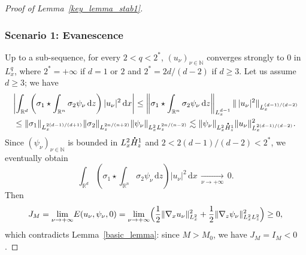 \documentclass[10pt]{amsart}
\theoremstyle{definition}
\newcommand*{\overbigdot}[1]{%
\accentset{\mbox{\large\bfseries .}}{#1}}
\newenvironment{ProofOf}[1]{\begin{proof}[Proof of #1]}{\end{proof}}
\newcommand{\R}{\mathbb{R}}
\newcommand{\ud}{\, {\mathrm{d}}}
\begin{document}
\begin{ProofOf}{Lemma~\ref{key_lemma_stab1}}
\subsubsection*{Scenario 1: Evanescence} Up to a sub-sequence, for every $2<q<2^{*}$, $(u_{\nu})_{\nu\in\mathbb N}$ converges strongly to $0$ in $L_{x}^{q}$,
where $2^{*}=+\infty$ if $d=1$ or $2$ and $2^{*}=2d/(d-2)$ if $d\geq 3$. Let us assume $d\geq 3$; we have\vspace*{-3pt}
\begin{multline*}
\left|\int_{\R^{d}}\left(\sigma_{1}\star\int_{\R^{n}}\sigma_{2}\psi_{\nu}\ud z\right)|u_{\nu}|^{2}\ud x\right|\leq\left\|\sigma_{1}\star\int_{\R^{n}}\sigma_{2}\psi_{\nu}\ud z\right\|_{L_{x}^{d-1}}\|\,|u_{\nu}|^{2}\|_{L_{x}^{(d-1)/(d-2)}}\\
\leq\|\sigma_{1}\|_{L_{x}^{2(d-1)/(d+1)}}\|\sigma_{2}\|_{L_{z}^{2n/(n+2)}}\|\psi_{\nu}\|_{L_{x}^{2}L_{z}^{2n/(n-2)}}\lesssim\|\psi_{\nu}\|_{L_{x}^{2}\overbigdot{H}_{z}^{1}}\|u_{\nu}\|_{L_{x}^{2(d-1)/(d-2)}}^{2}.
\end{multline*}
Since $(\psi_{\nu})_{\nu\in\mathbb N}$ is bounded in $L_{x}^{2}\overbigdot{H}_{z}^{1}$ and $2<2(d-1)/(d-2)<2^{*}$, we even\-tual\-ly obtain\vspace*{-3pt}
\[
\int_{\R^{d}}\left(\sigma_{1}\star\int_{\R^{n}}\sigma_{2}\psi_{\nu}\ud z\right)|u_{\nu}|^{2}\ud x\,\underset{\nu\to +\infty}{\to}\,0.
\]
Then
\[
J_{M}=\underset{\nu\to+\infty}{\lim}E(u_{\nu},\psi_{\nu},0)=\underset{\nu\to+\infty}{\lim}\Bigl(\frac{1}{2}\|\nabla_{x}u_\nu\|_{L_{x}^{2}}^{2}+\frac{1}{2}\|\nabla_{z}\psi_{\nu}\|_{L_{x}^{2}L_{z}^{2}}^{2}\Bigr)\geq 0,
\]
which contradicts Lemma~\ref{basic_lemma}: since $M>M_0$, we have $J_{M}=I_M<0$.


\end{ProofOf}
\end{document}
